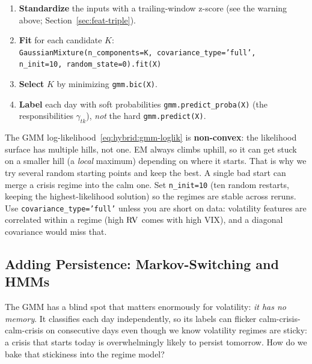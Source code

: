 \begin{keyidea}
\begin{enumerate}
  \item \textbf{Standardize} the inputs with a trailing-window z-score
        (see the warning above; Section~\ref{sec:feat-triple}).
  \item \textbf{Fit} for each candidate $K$:\\
        \texttt{GaussianMixture(n\_components=K, covariance\_type='full',\\
        \hspace*{2em}n\_init=10, random\_state=0).fit(X)}
  \item \textbf{Select} $K$ by minimizing \texttt{gmm.bic(X)}.
  \item \textbf{Label} each day with soft probabilities
        \texttt{gmm.predict\_proba(X)} (the responsibilities
        $\gamma_{tk}$), \emph{not} the hard \texttt{gmm.predict(X)}.
\end{enumerate}
\end{keyidea}

\begin{warning}
The GMM log-likelihood~\eqref{eq:hybrid:gmm-loglik} is \textbf{non-convex}:
the likelihood surface has multiple hills, not one.  EM always climbs
uphill, so it can get stuck on a smaller hill (a \emph{local} maximum)
depending on where it starts.  That is why we try several random starting
points and keep the best.  A single bad start can merge a crisis regime
into the calm one.  Set \texttt{n\_init=10} (ten random restarts, keeping the
highest-likelihood solution) so the regimes are stable across reruns.  Use
\texttt{covariance\_type='full'} unless you are short on data: volatility
features are correlated within a regime (high $\operatorname{RV}$ comes with high VIX),
and a diagonal covariance would miss that.
\end{warning}

\subsection{Adding Persistence: Markov-Switching and HMMs}
\label{sec:hybrid:markov}

The GMM has a blind spot that matters enormously for volatility:
\emph{it has no memory}.  It classifies each day independently, so its
labels can flicker calm-crisis-calm-crisis on consecutive days even though
we know volatility regimes are sticky: a crisis that starts today is
overwhelmingly likely to persist tomorrow.  How do we bake that
stickiness into the regime model?

